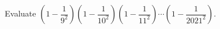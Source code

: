 Evaluate $\left(1-\dfrac{1}{9^2}\right)\left(1-\dfrac{1}{10^2}\right)\left(1-\dfrac{1}{11^2}\right)\cdots\left(1-\dfrac{1}{2021^2}\right)$.
